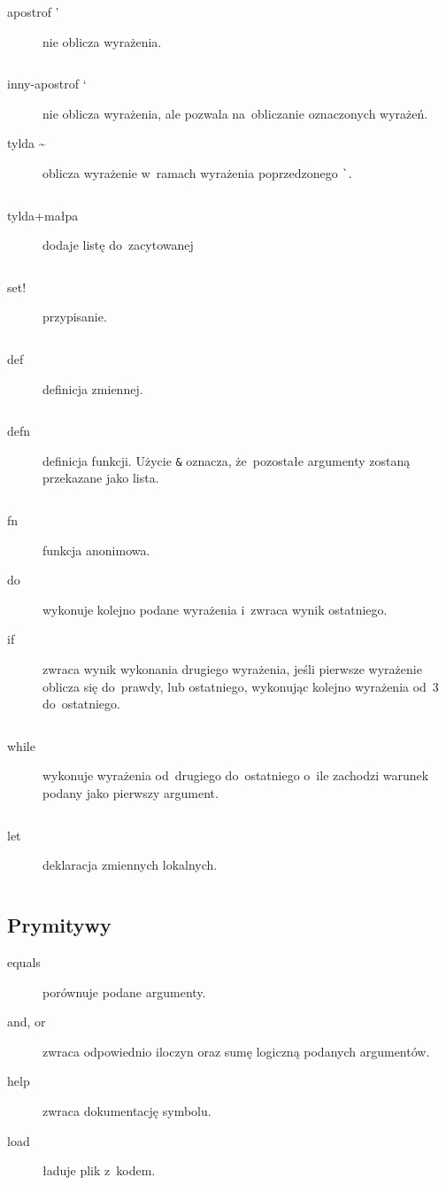 \documentclass[a4paper,11pt]{article}
\newcommand{\clj}[1]{\inputminted[fontsize=\footnotesize]{clojure}{code/#1.clj}}
\begin{document}
\begin{description}
\item[apostrof '] nie oblicza wyrażenia.
  \clj{quote}

\item[inny-apostrof `] nie oblicza wyrażenia, ale pozwala na~obliczanie
  oznaczonych wyrażeń.

\item[tylda \textasciitilde] oblicza wyrażenie w~ramach wyrażenia poprzedzonego
  \verb+`+.
  \clj{unquote}

\item[tylda+małpa \textasciitilde@] dodaje listę do~zacytowanej
  \clj{unquote-splicing}

\item[set!] przypisanie.
  \clj{set!}

\item[def] definicja zmiennej.
  \clj{def}

\item[defn] definicja funkcji. Użycie \verb+&+ oznacza, że~pozostałe argumenty
  zostaną przekazane jako lista.
  \clj{defn}

\item[fn] funkcja anonimowa.

\item[do] wykonuje kolejno podane wyrażenia i~zwraca wynik ostatniego.

\item[if] zwraca wynik wykonania drugiego wyrażenia, jeśli pierwsze wyrażenie
  oblicza się do~prawdy, lub ostatniego, wykonując kolejno wyrażenia od~3
  do~ostatniego.
  \clj{if}

\item[while] wykonuje wyrażenia od~drugiego do~ostatniego o~ile zachodzi
  warunek podany jako pierwszy argument.
  \clj{while}

\item[let] deklaracja zmiennych lokalnych.
  \clj{let}
\end{description}

\subsection{Prymitywy}

\begin{description}
\item[equals] porównuje podane argumenty.

\item[and, or] zwraca odpowiednio iloczyn oraz sumę logiczną podanych
  argumentów.

\item[help] zwraca dokumentację symbolu.

\item[load] ładuje plik z~kodem.
\end{description}
\end{document}
